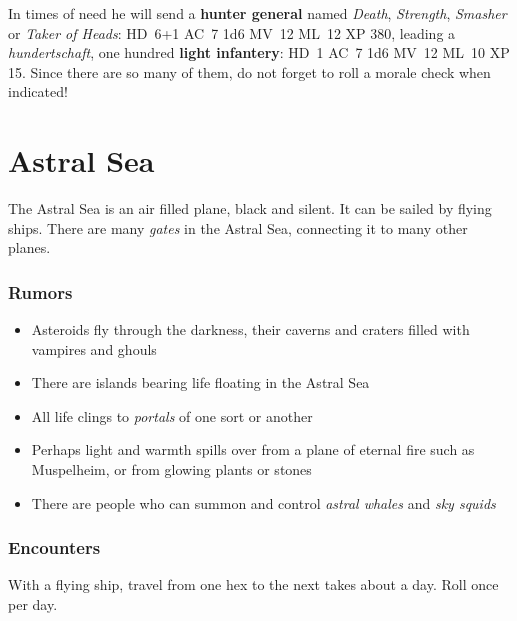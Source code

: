 \documentclass[a4paper,serif]{rpg-module}
\begin{document}
In times of need he will send a \textbf{hunter general} named
\textit{Death}, \textit{Strength}, \textit{Smasher} or \textit{Taker
  of Heads}: HD~6+1 AC~7 1d6 MV~12 ML~12 XP 380, leading a
\emph{hundertschaft}, one hundred \textbf{light infantery}: HD~1 AC~7
1d6 MV~12 ML~10 XP 15. Since there are so many of them, do not forget
to roll a morale check when indicated!

\newpage

\part{Astral Sea}

The Astral Sea is an air filled plane, black and silent. It can be
sailed by flying ships. There are many \textit{gates} in the Astral
Sea, connecting it to many other planes.


\section{Rumors}

\begin{itemize}
\item Asteroids fly through the darkness, their caverns and craters
  filled with vampires and ghouls
\item There are islands bearing life floating in the Astral Sea
\item All life clings to \textit{portals} of one sort or another
\item Perhaps light and warmth spills over from a plane of eternal
  fire such as Muspelheim, or from glowing plants or stones
\item There are people who can summon and control \textit{astral
  whales} and \textit{sky squids}
\end{itemize}

\section{Encounters}

With a flying ship, travel from one hex to the next takes about a day.
Roll once per day.
\end{document}
